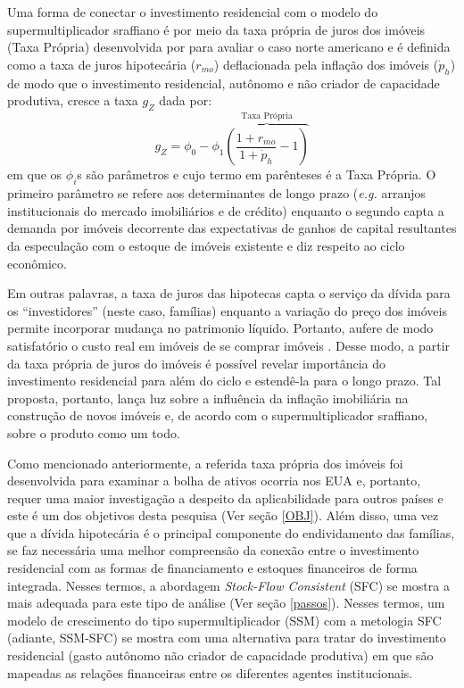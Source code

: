 Uma forma de conectar o investimento residencial com o modelo do supermultiplicador sraffiano é por meio da taxa própria de juros dos imóveis (Taxa Própria) desenvolvida por \textcite{teixeira_crescimento_2015} para avaliar o caso norte americano e é definida como a taxa de juros hipotecária ($r_{mo}$) deflacionada pela inflação dos imóveis ({$\dot p_h$}) de modo que o investimento residencial, autônomo e não criador de capacidade produtiva, cresce a taxa $g_Z$ dada por:
\begin{equation}
g_Z = \phi_0 - \phi_1 \overbrace{\left(\frac{1+r_{mo}}{1+\dot p_h} - 1\right)}^{\text{Taxa Própria}}
\end{equation}
em que os $\phi_i$s são parâmetros e cujo termo em parênteses é a Taxa Própria. O primeiro parâmetro se refere aos determinantes de longo prazo (\textit{e.g.} arranjos institucionais do mercado imobiliários e de crédito) enquanto o segundo capta a demanda por imóveis decorrente das expectativas de ganhos de capital resultantes da especulação com o estoque de imóveis existente e diz respeito ao ciclo econômico.

Em outras palavras, a taxa de juros das hipotecas capta o serviço da dívida para os ``investidores'' (neste caso, famílias) enquanto a variação do preço dos imóveis permite incorporar mudança no patrimonio líquido. Portanto, aufere de modo satisfatório o custo real em imóveis de se comprar imóveis \cite[p.~53]{teixeira_crescimento_2015}. Desse modo, a partir da taxa própria de juros do imóveis é possível revelar importância do investimento residencial para além do ciclo e estendê-la para o longo prazo.  Tal proposta, portanto, lança luz sobre a influência da inflação imobiliária na construção de novos imóveis e, de acordo com o supermultiplicador sraffiano, sobre o produto como um todo. 

Como mencionado anteriormente, a referida taxa própria dos imóveis foi desenvolvida para examinar a bolha de ativos ocorria nos EUA e, portanto, requer uma maior investigação a despeito da aplicabilidade para outros países e este é um dos objetivos desta pesquisa (Ver seção \ref{OBJ}). Além disso, uma vez que a dívida hipotecária é o principal componente do endividamento das famílias, se faz necessária uma melhor compreensão da conexão entre o investimento residencial com as formas de financiamento e estoques financeiros de forma integrada. Nesses termos, a abordagem \textit{Stock-Flow Consistent} (SFC) se mostra a mais adequada para este tipo de análise (Ver seção \ref{passos}). Nesses termos, um modelo de crescimento do tipo supermultiplicador (SSM) com a metologia SFC (adiante, SSM-SFC) se mostra com uma alternativa para tratar do investimento residencial (gasto autônomo não criador de capacidade produtiva) em que são mapeadas as relações financeiras entre os diferentes agentes institucionais.


